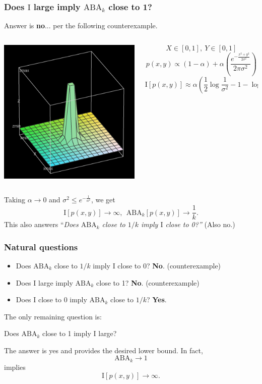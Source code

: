 \documentclass{beamer}
\begin{document}
\begin{frame}
\frametitle{Does $\text{I}$ large imply $\text{ABA}_k$ close to 1?}
Answer is \textbf{no}... per the following counterexample.
\begin{columns}
\begin{column}{0.5\textwidth}
\begin{center}
\includegraphics[scale = 0.3]{witch_hat_func.png}
\end{center}
\end{column}
\begin{column}{0.5\textwidth}
\[
X \in [0,1],\ Y \in [0,1]
\]
\[
p(x, y) \propto (1- \alpha) + \alpha \left( \frac{e^{-\frac{x^2 + y^2}{2\sigma^2}}}{2\pi\sigma^2} \right)
\]
\[
\text{I}[p(x, y)] \approx \alpha(\frac{1}{2}\log \frac{1}{\sigma^2} - 1- \log (2\pi))
\]
\end{column}
\end{columns}
Taking $\alpha \to 0$ and $\sigma^2 \leq e^{-\frac{1}{\alpha^2}}$, we get 
\[\text{I}[p(x, y)] \to \infty,\ \ \text{ABA}_k[p(x, y)] \to \frac{1}{k}.\]
This also answers ``\emph{Does $\text{ABA}_k$ close to $1/k$ imply $\text{I}$ close to 0?''} (Also no.)
\end{frame}

\begin{frame}
\frametitle{Natural questions}

\begin{itemize}
\item Does $\text{ABA}_k$ close to $1/k$ imply $\text{I}$ close to 0? \textbf{No}. (counterexample)
\item Does $\text{I}$ large imply $\text{ABA}_k$ close to 1?  \textbf{No}. (counterexample)
\item Does $\text{I}$ close to $0$ imply $\text{ABA}_k$ close to $1/k$? \textbf{Yes}.
\end{itemize}

The only remaining question is:
\vspace{0.2in}

Does $\text{ABA}_k$ close to 1 imply $\text{I}$ large?
\vspace{0.2in}

The answer is yes and provides the desired lower bound.  In fact,
\[
\text{ABA}_k \to 1
\]
implies
\[
\text{I}[p(x, y)] \to \infty.
\]
\end{frame}
\end{document}
